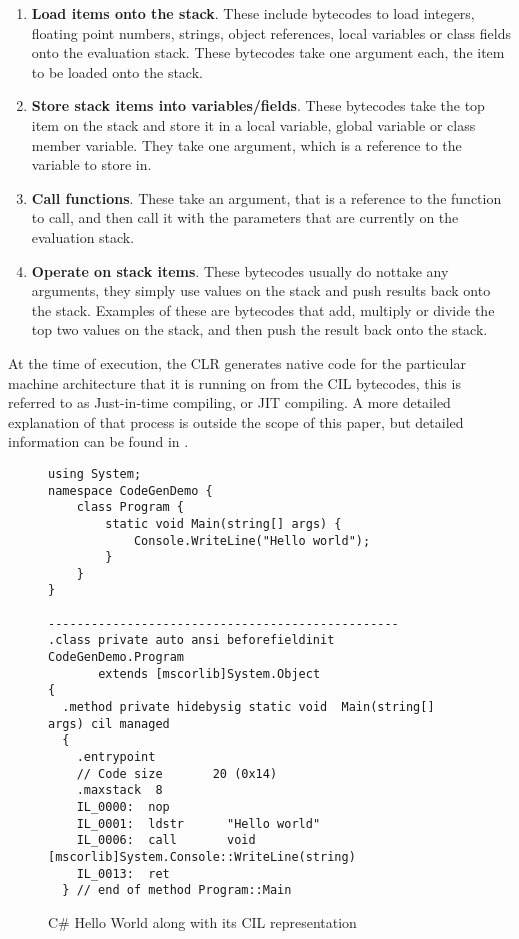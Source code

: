 	\begin{enumerate}
		\item \textbf{Load items onto the stack}. These include bytecodes to load
		integers, floating point numbers, strings, object references, local 
		variables or class fields onto the evaluation stack. These bytecodes take 
		one argument each, the item to be loaded onto the stack.
		
		\item \textbf{Store stack items into variables/fields}. These bytecodes 
		take the top item on the stack and store it in a local variable, global 
		variable or class member variable. They take one argument, which is a 
		reference to the variable to store in.
		
		\item \textbf{Call functions}. These take an argument, that is a reference 
		to the function to call, and then call it with the parameters that are 
		currently on the evaluation stack.
			
		\item \textbf{Operate on stack items}. These bytecodes usually do nottake 
		any arguments, they simply use values on the stack and push results back 
		onto the stack. Examples of these are bytecodes that add, multiply or 
		divide the top two values on the stack, and then push the result back onto 
		the stack.
		
	\end{enumerate}
	
	At the time of execution, the CLR generates native code for the particular 
	machine architecture that it is running on from the CIL bytecodes, this is 
	referred to as Just-in-time compiling, or JIT compiling. A more detailed 
	explanation of that process is outside the scope of this paper, but detailed
	information can be found in .
	
\begin{figure}
\label{fig:cil}
\caption{C\# Hello World along with its CIL representation}
\lstset{language=CSharp}
\lstset{commentstyle=\textit}
\begin{lstlisting}[frame=trbl]
using System;
namespace CodeGenDemo {
    class Program {
        static void Main(string[] args) {
            Console.WriteLine("Hello world");
        }
    }
}

-------------------------------------------------
.class private auto ansi beforefieldinit CodeGenDemo.Program
       extends [mscorlib]System.Object
{
  .method private hidebysig static void  Main(string[] args) cil managed
  {
    .entrypoint
    // Code size       20 (0x14)
    .maxstack  8
    IL_0000:  nop
    IL_0001:  ldstr      "Hello world"
    IL_0006:  call       void [mscorlib]System.Console::WriteLine(string)
    IL_0013:  ret
  } // end of method Program::Main
\end{lstlisting}
\end{figure}
